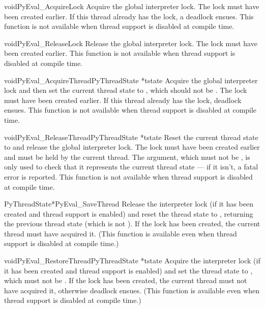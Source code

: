 \documentclass{manual}
\begin{document}
\begin{cfuncdesc}{void}{PyEval_AcquireLock}{}
Acquire the global interpreter lock.  The lock must have been created
earlier.  If this thread already has the lock, a deadlock ensues.
This function is not available when thread support is disabled at
compile time.
\end{cfuncdesc}

\begin{cfuncdesc}{void}{PyEval_ReleaseLock}{}
Release the global interpreter lock.  The lock must have been created
earlier.  This function is not available when thread support is
disabled at compile time.
\end{cfuncdesc}

\begin{cfuncdesc}{void}{PyEval_AcquireThread}{PyThreadState *tstate}
Acquire the global interpreter lock and then set the current thread
state to , which should not be \NULL{}.  The lock must
have been created earlier.  If this thread already has the lock,
deadlock ensues.  This function is not available when thread support
is disabled at compile time.
\end{cfuncdesc}

\begin{cfuncdesc}{void}{PyEval_ReleaseThread}{PyThreadState *tstate}
Reset the current thread state to \NULL{} and release the global
interpreter lock.  The lock must have been created earlier and must be
held by the current thread.  The  argument, which must not
be \NULL{}, is only used to check that it represents the current
thread state --- if it isn't, a fatal error is reported.  This
function is not available when thread support is disabled at compile
time.
\end{cfuncdesc}

\begin{cfuncdesc}{PyThreadState*}{PyEval_SaveThread}{}
Release the interpreter lock (if it has been created and thread
support is enabled) and reset the thread state to \NULL{},
returning the previous thread state (which is not \NULL{}).  If
the lock has been created, the current thread must have acquired it.
(This function is available even when thread support is disabled at
compile time.)
\end{cfuncdesc}

\begin{cfuncdesc}{void}{PyEval_RestoreThread}{PyThreadState *tstate}
Acquire the interpreter lock (if it has been created and thread
support is enabled) and set the thread state to , which
must not be \NULL{}.  If the lock has been created, the current
thread must not have acquired it, otherwise deadlock ensues.  (This
function is available even when thread support is disabled at compile
time.)
\end{cfuncdesc}
\end{document}
